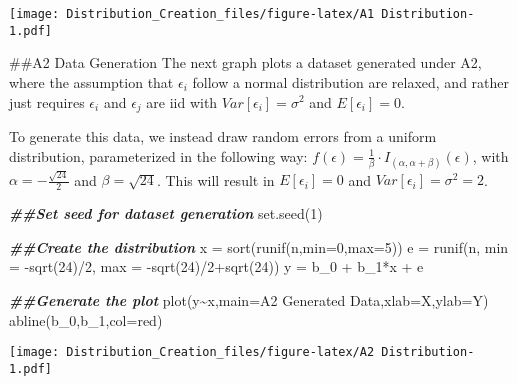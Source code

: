 \documentclass[
]{article}
\newenvironment{Shaded}{\begin{snugshade}}{\end{snugshade}}
\newcommand{\AttributeTok}[1]{\textcolor[rgb]{0.77,0.63,0.00}{#1}}
\newcommand{\DecValTok}[1]{\textcolor[rgb]{0.00,0.00,0.81}{#1}}
\newcommand{\DocumentationTok}[1]{\textcolor[rgb]{0.56,0.35,0.01}{\textbf{\textit{#1}}}}
\newcommand{\FunctionTok}[1]{\textcolor[rgb]{0.00,0.00,0.00}{#1}}
\newcommand{\NormalTok}[1]{#1}
\newcommand{\OtherTok}[1]{\textcolor[rgb]{0.56,0.35,0.01}{#1}}
\newcommand{\SpecialCharTok}[1]{\textcolor[rgb]{0.00,0.00,0.00}{#1}}
\newcommand{\StringTok}[1]{\textcolor[rgb]{0.31,0.60,0.02}{#1}}
\begin{document}
\texttt{[image: Distribution\_Creation\_files/figure-latex/A1 Distribution-1.pdf]}

\#\#A2 Data Generation The next graph plots a dataset generated under
A2, where the assumption that \(\epsilon_i\) follow a normal
distribution are relaxed, and rather just requires \(\epsilon_i\) and
\(\epsilon_j\) are iid with \(Var[\epsilon_i]=\sigma^2\) and
\(E[\epsilon_i]=0\).

To generate this data, we instead draw random errors from a uniform
distribution, parameterized in the following way:
\(f(\epsilon) = \frac{1}{\beta}\cdot I_{(\alpha,\alpha+\beta)}(\epsilon)\),
with \(\alpha = -\frac{\sqrt{24}}{2}\) and \(\beta = \sqrt{24}\). This
will result in \(E[\epsilon_i]=0\) and \(Var[\epsilon_i]=\sigma^2=2\).

\begin{Shaded}
\begin{Highlighting}[]
\DocumentationTok{\#\#Set seed for dataset generation}
\FunctionTok{set.seed}\NormalTok{(}\DecValTok{1}\NormalTok{)}

\DocumentationTok{\#\#Create the distribution }
\NormalTok{x }\OtherTok{=} \FunctionTok{sort}\NormalTok{(}\FunctionTok{runif}\NormalTok{(n,}\AttributeTok{min=}\DecValTok{0}\NormalTok{,}\AttributeTok{max=}\DecValTok{5}\NormalTok{))}
\NormalTok{e }\OtherTok{=} \FunctionTok{runif}\NormalTok{(n, }\AttributeTok{min =} \SpecialCharTok{{-}}\FunctionTok{sqrt}\NormalTok{(}\DecValTok{24}\NormalTok{)}\SpecialCharTok{/}\DecValTok{2}\NormalTok{, }\AttributeTok{max =} \SpecialCharTok{{-}}\FunctionTok{sqrt}\NormalTok{(}\DecValTok{24}\NormalTok{)}\SpecialCharTok{/}\DecValTok{2}\SpecialCharTok{+}\FunctionTok{sqrt}\NormalTok{(}\DecValTok{24}\NormalTok{))}
\NormalTok{y }\OtherTok{=}\NormalTok{ b\_0 }\SpecialCharTok{+}\NormalTok{ b\_1}\SpecialCharTok{*}\NormalTok{x }\SpecialCharTok{+}\NormalTok{ e}

\DocumentationTok{\#\#Generate the plot}
\FunctionTok{plot}\NormalTok{(y}\SpecialCharTok{\textasciitilde{}}\NormalTok{x,}\AttributeTok{main=}\StringTok{\textquotesingle{}A2 Generated Data\textquotesingle{}}\NormalTok{,}\AttributeTok{xlab=}\StringTok{\textquotesingle{}X\textquotesingle{}}\NormalTok{,}\AttributeTok{ylab=}\StringTok{\textquotesingle{}Y\textquotesingle{}}\NormalTok{)}
\FunctionTok{abline}\NormalTok{(b\_0,b\_1,}\AttributeTok{col=}\StringTok{\textquotesingle{}red\textquotesingle{}}\NormalTok{)}
\end{Highlighting}
\end{Shaded}

\texttt{[image: Distribution\_Creation\_files/figure-latex/A2 Distribution-1.pdf]}
\end{document}
